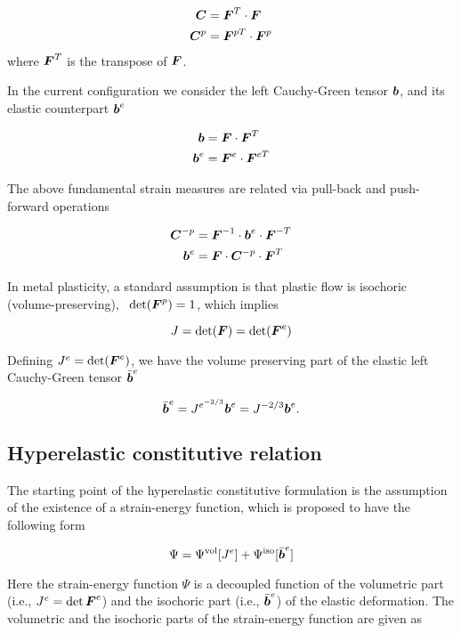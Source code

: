 \begin{align}
  {\boldsymbol{C}} &= {\boldsymbol{F}}^T \cdot {\boldsymbol{F}}\\ {\boldsymbol{C}}^p &= {\boldsymbol{F}}^{pT} \cdot {\boldsymbol{F}}^p
\end{align}
where ${\boldsymbol{F}}^T$ is the transpose of ${\boldsymbol{F}}$.

In the current configuration we consider the left Cauchy-Green tensor
${\boldsymbol{b}}$, and its elastic counterpart ${{\boldsymbol{b}}}^e$

\begin{align}
  {\boldsymbol{b}} &= {\boldsymbol{F}} \cdot {\boldsymbol{F}}^{T}\\ {\boldsymbol{b}}^e &= {\boldsymbol{F}}^e \cdot
  {\boldsymbol{F}}^{eT}\label{eq:be}
\end{align}

The above fundamental strain measures are related via pull-back and
push-forward operations

\begin{align}\label{eq:pullpush}
  {\boldsymbol{C}}^{-p} &={\boldsymbol{F}}^{-1} \cdot {\boldsymbol{b}}^e \cdot {\boldsymbol{F}}^{-T}\\ {\boldsymbol{b}}^e &= {\boldsymbol{F}} \cdot
  {\boldsymbol{C}}^{-p} \cdot {\boldsymbol{F}}^T
\end{align}

In metal plasticity, a standard assumption is that plastic flow is
isochoric (volume-preserving), \ie\ $\det({\boldsymbol{F}}^p)=1$, which implies

\begin{equation}
  J = \det ({\boldsymbol{F}}) = \det ({\boldsymbol{F}}^e)
\end{equation}

Defining $J^e=\det({\boldsymbol{F}}^e)$, we have the volume preserving part of the
elastic left Cauchy-Green tensor $\bar{{\boldsymbol{b}}}^e$

\begin{equation}
  \bar{{\boldsymbol{b}}}^e = J^{e^{-2/3}}{\boldsymbol{b}}^e = J^{-2/3}{\boldsymbol{b}}^e.
\end{equation}

\subsection{Hyperelastic constitutive relation}

The starting point of the hyperelastic constitutive formulation is the
assumption of the existence of a strain-energy function, which is
proposed to have the following form

\begin{equation}
\Psi=\Psi^{\rm vol}[J^e] + \Psi^{\rm iso}[\bar{{\boldsymbol{b}}}^e]
\end{equation}

Here the strain-energy function $\Psi$ is a decoupled function of the
volumetric part (i.e., $J^e=\det{\boldsymbol{F}}^e$) and the isochoric part (i.e.,
$\bar{{\boldsymbol{b}}}^e$) of the elastic deformation. The volumetric and the
isochoric parts of the strain-energy function are given as

